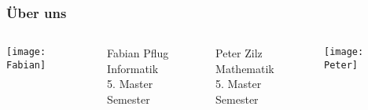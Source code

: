 \begin{frame}
    \frametitle{Über uns}
	\begin{columns}
		\begin{column}{0.25\textwidth}
			\texttt{[image: Fabian]}
		\end{column}
		\begin{column}{0.25\textwidth}
		\begin{flushleft} 
			Fabian Pflug\\
			
			Informatik\\
			
			5. Master Semester\\
		\end{flushleft}
		\end{column}
		\begin{column}{0.25\textwidth}
		\begin{flushright} 
			Peter Zilz\\
			
			Mathematik\\
			
			5. Master Semester\\
		\end{flushright}
		\end{column}
		\begin{column}{0.25\textwidth}
			\texttt{[image: Peter]}
		\end{column}
	\end{columns}
\end{frame}

